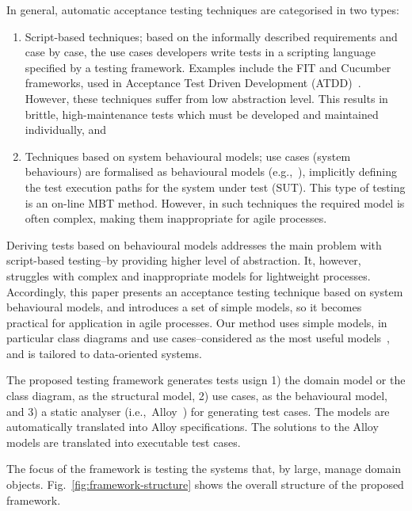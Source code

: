 In general, automatic acceptance testing techniques are categorised in two types:
\begin{enumerate}
	\item Script-based techniques; based on the informally described requirements and case by case, the use cases developers write tests in a scripting language specified by a testing framework. Examples include the FIT and Cucumber frameworks, used in Acceptance Test Driven Development (ATDD)~\cite{Pugh2011}. However, these techniques suffer from low abstraction level. This results in	brittle, high-maintenance tests which must be developed and maintained individually, and
	
	\item Techniques based on system behavioural models;  use cases (system behaviours) are formalised as behavioural models (e.g.,~\cite{Nebut2006,Sarma2007,Kaplan2008}), implicitly defining the test execution paths for the system under test (SUT). This type of testing is an on-line MBT method. However, in such techniques the required model is often complex, making them inappropriate for agile processes.

\end{enumerate} 

Deriving tests based on behavioural models addresses the main problem with script-based testing--by providing higher level of abstraction. It, however, struggles with complex and inappropriate models for lightweight processes. Accordingly, this paper presents an acceptance testing technique based on system behavioural models, and introduces a set of simple models, so it becomes practical for application in agile processes. Our method uses simple models, in particular class diagrams and use cases--considered as the most useful models~\cite{Erickson2007,Erickson2008}, and is tailored to data-oriented systems.



The proposed testing framework generates tests usign 1) the domain model or the class diagram, as the structural model, 2) use cases, as the behavioural model, and 3) a static analyser (i.e.,\ Alloy~\cite{Jackson2002}) for generating test cases. The models are automatically translated into Alloy specifications. The solutions to the Alloy models are translated into executable test cases.

The focus of the framework is testing the systems that, by large, manage domain objects. Fig.~\ref{fig:framework-structure} shows the overall structure of the proposed framework.

